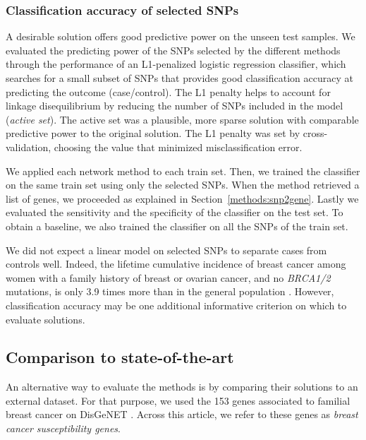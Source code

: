 \documentclass[10pt,letterpaper]{article}
\begin{document}
\subsubsection{Classification accuracy of selected SNPs}
\label{methods:classifier}

A desirable solution offers good predictive power on the unseen test samples. We evaluated the predicting power of the SNPs selected by the different methods through the performance of an L1-penalized logistic regression classifier, which searches for a small subset of SNPs that provides good classification accuracy at predicting the outcome (case/control). The L1 penalty helps to account for linkage disequilibrium by reducing the number of SNPs included in the model (\emph{active set}). The active set was a plausible, more sparse solution with comparable predictive power to the original solution. The L1 penalty was set by cross-validation, choosing the value that minimized misclassification error.

We applied each network method to each train set. Then, we trained the classifier on the same train set using only the selected SNPs. When the method retrieved a list of genes, we proceeded as explained in Section~\ref{methods:snp2gene}. Lastly we evaluated the sensitivity and the specificity of the classifier on the test set. To obtain a baseline, we also trained the classifier on all the SNPs of the train set.

We did not expect a linear model on selected SNPs to separate cases from controls well. Indeed, the lifetime cumulative incidence of breast cancer among women with a family history of breast or ovarian cancer, and no \emph{BRCA1/2} mutations, is only 3.9 times more than in the general population \cite{Metcalfe2008}. However, classification accuracy may be one additional informative criterion on which to evaluate solutions.

\subsection{Comparison to state-of-the-art}
\label{methods:bcac}

An alternative way to evaluate the methods is by comparing their solutions to an external dataset. For that purpose, we used the 153 genes associated to familial breast cancer on DisGeNET \cite{pinero_disgenet:_2017}. Across this article, we refer to these genes as \emph{breast cancer susceptibility genes}.
\end{document}
